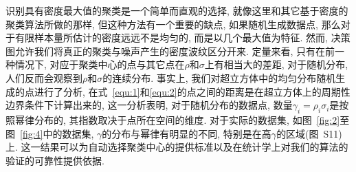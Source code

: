 识别具有密度最大值的聚类是一个简单而直观的选择, 就像这里和其它基于密度的聚类算法\cite{Ester1996,Fukunaga1975}所做的那样, 但这种方法有一个重要的缺点, 如果随机生成数据点, 那么对于有限样本量所估计的密度远远不是均匀的, 而是以几个最大值为特征. 然而, 决策图允许我们将真正的聚类与噪声产生的密度波纹区分开来. 定量来看, 只有在前一种情况下, 对应于聚类中心的点与其它点在$\rho$和$\sigma$上有相当大的差距, 对于随机分布, 人们反而会观察到$\rho$和$\sigma$的连续分布. 事实上, 我们对超立方体中的均匀分布随机生成的点进行了分析, 在式~\ref{equ:1}和\ref{equ:2}的点之间的距离是在超立方体上的周期性边界条件下计算出来的, 这一分析表明, 对于随机分布的数据点, 数量$\gamma_i= \rho_i\sigma_i$是按照幂律分布的, 其指数取决于点所在空间的维度. 对于实际的数据集, 如图~\ref{fig:2}至图~\ref{fig:4}中的数据集, $\gamma$的分布与幂律有明显的不同, 特别是在高$\gamma$的区域(图~S11)上. 这一结果可以为自动选择聚类中心的提供标准以及在统计学上对我们的算法的验证的可靠性提供依据. 

